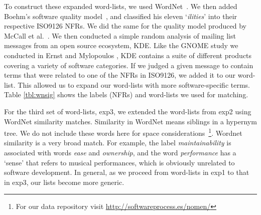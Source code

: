 \documentclass[smallextended]{svjour3}       %
\begin{document}
To construct these expanded word-lists, we used
WordNet~\cite{Fellbaum1998}.
We then added Boehm's software quality model~\cite{Boehm+:1976:ICSE}, and classified his eleven `\emph{ilities}' into their respective ISO9126 NFRs. 
We did the same for the quality model produced by McCall et al.~\cite{mccall1977}. 
We then conducted a simple random analysis of mailing list messages from an open source ecosystem, KDE. Like the GNOME study we conducted in Ernst and Mylopoulos \cite{ernst10refsq}, KDE contains a suite of different products covering a variety of software categories. If we judged a given message to contain terms that were
related to one of the NFRs in ISO9126, we added it to our word-list. This allowed us to expand our word-lists with more software-specific terms.
Table \ref{tbl:wnsig} shows the labels (NFRs) and word-lists we used for matching.

For the third set of word-lists, \textsf{exp3}, we extended the word-lists from \textsf{exp2} using WordNet similarity matches. 
Similarity in WordNet means siblings in a hypernym tree. 
We do not include these words here for space
considerations~\footnote{For our data repository visit \url{http://softwareprocess.es/nomen/}}. 
Wordnet similarity is a very broad match. For example, the label \emph{maintainability} is associated with
words \emph{ease} and \emph{ownership}, and the word \emph{performance} has a `sense' that refers to musical performances, which is obviously unrelated to software development. In general, as we proceed from word-lists in \textsf{exp1} to that in \textsf{exp3}, our lists become more generic.
\end{document}
